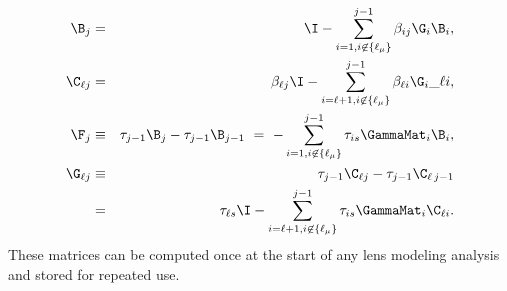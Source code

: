 \begin{eqnarray}
\B_j &=& \I - \sum\limits_{i=1,i\not \in \{\ell_\mu\}}^{j-1}\beta_{ij}\G_i \B_i, \\
\label{eqn:cmatdef}\C_{\ell j} &=& \beta_{\ell j} \I - \sum\limits_{i=\ell+1, i\not\in\{\ell_\mu\}}^{j-1} \beta_{\ell i}\G_i\_{\ell i}, \\
\F_j &\equiv& \tau_{j-1} \B_{j}-\tau_{j-1} \B_{j-1}
  \ =\ - \sum\limits_{i=1,i\not \in \{\ell_\mu\}}^{j-1} \tau_{is}\GammaMat_i\B_i, \\
\G_{\ell j}&\equiv& \tau_{j-1} \C_{\ell j}-\tau_{j-1} \C_{\ell \,j-1}
  \nonumber \\
   &=&\ \tau_{\ell s}\I- \sum\limits_{i=\ell+1,i \not \in \{\ell_\mu\}}^{j-1} \tau_{is}\GammaMat_i\C_{\ell i}.
\end{eqnarray}
These matrices can be computed once at the start of any lens modeling analysis and stored for repeated use.
  
  